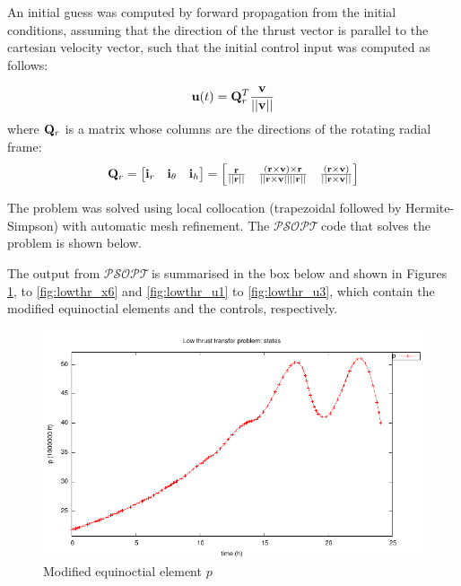 \documentclass[a4paper,11pt]{report}    %
\newcommand{\psopt}{$\mathcal{PSOPT}$\,}  %
\newcommand{\mt}[1]{\ensuremath \mathbf{#1}}
\newenvironment{shadedframe}{%
  \def\FrameCommand{\fcolorbox{black}{shadecolor}}%
  \MakeFramed {\FrameRestore}}
{\endMakeFramed}
\begin{document}
An initial guess was computed by forward propagation from the initial conditions, assuming that
the direction of the thrust vector is parallel to the cartesian velocity vector, such that the initial control input was computed as follows:

\begin{equation}
 \mt{u}(t) = \mt{Q}_r^T \frac{\mt{v} }{ ||\mt{v}|| }
\end{equation}
where $\mt{Q}_r$ is a matrix whose columns are the directions of the rotating radial frame:
\begin{equation}
  \mt{Q}_r = \begin{bmatrix} \mt{i}_r &\mt{i}_\theta & \mt{i}_h \end{bmatrix}  = \begin{bmatrix} \frac{\mt{r}}{||\mt{r}||} &  \frac{(\mt{r}\times \mt{v})\times \mt{r}}{|| \mt{r} \times \mt{v} || || \mt{r}|| } & \frac{(\mt{r}\times \mt{v})}{|| \mt{r} \times \mt{v} || }\end{bmatrix}
\end{equation}


The problem was solved using local collocation (trapezoidal followed by Hermite-Simpson) with automatic mesh refinement. The \psopt code
that solves the problem is shown below.

\tiny
\begin{shadedframe}

\end{shadedframe}
\normalsize

The output from \psopt is summarised in the box below and shown in Figures \ref{fig:lowthr_x1}, to \ref{fig:lowthr_x6} and \ref{fig:lowthr_u1} 
to \ref{fig:lowthr_u3}, which contain the modified equinoctial
elements  and the controls, respectively.

\begin{shadedframe}

\end{shadedframe}






\begin{figure}
  \centering 
  \includegraphics{../examples/lowthr/lowthr_x1}
  \caption{Modified equinoctial element $p$}
 \label{fig:lowthr_x1}
\end{figure}
\end{document}
